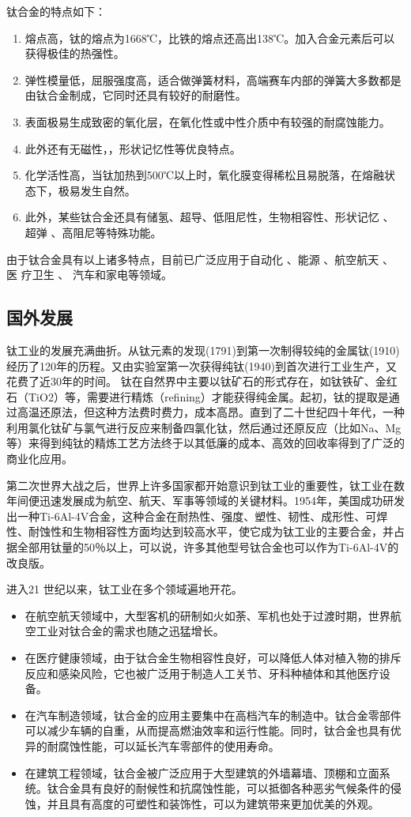 \documentclass[
class = book,
zihao = -4,
font = noto,
paper = a4paper,
openany
]{easybook}
\begin{document}
		钛合金的特点如下\cite{1997titanium}：
	\begin{enumerate}
		\item 熔点高，钛的熔点为1668℃，比铁的熔点还高出138℃。加入合金元素后可以获得极佳的热强性。
		\item 弹性模量低，屈服强度高，适合做弹簧材料，高端赛车内部的弹簧大多数都是由钛合金制成，它同时还具有较好的耐磨性。
		\item 表面极易生成致密的氧化层，在氧化性或中性介质中有较强的耐腐蚀能力。
		\item 此外还有无磁性，，形状记忆性等优良特点。
		\item 化学活性高，当钛加热到500℃以上时，氧化膜变得稀松且易脱落，在熔融状态下，极易发生自然。
		\item 此外，某些钛合金还具有储氢、超导、低阻尼性，生物相容性、形状记忆 、 超弹 、高阻尼等特殊功能。
	\end{enumerate}

	由于钛合金具有以上诸多特点，目前已广泛应用于自动化 、能源 、航空航天 、 医	疗卫生 、 汽车和家电等领域。
	\subsection{国外发展}
	钛工业的发展充满曲折。从钛元素的发现(1791)到第一次制得较纯的金属钛(1910)经历了120年的历程。又由实验室第一次获得纯钛(1940)到首次进行工业生产，又花费了近30年的时间。
	钛在自然界中主要以钛矿石的形式存在，如钛铁矿、金红石（TiO2）等，需要进行精炼（refining）才能获得纯金属。起初，钛的提取是通过高温还原法，但这种方法费时费力，成本高昂。直到了二十世纪四十年代，一种利用氯化钛矿与氯气进行反应来制备四氯化钛，然后通过还原反应（比如Na、Mg等）来得到纯钛的精炼工艺方法终于以其低廉的成本、高效的回收率得到了广泛的商业化应用。

	第二次世界大战之后，世界上许多国家都开始意识到钛工业的重要性，钛工业在数年间便迅速发展成为航空、航天、军事等领域的关键材料。1954年，美国成功研发出一种Ti-6Al-4V合金，这种合金在耐热性、强度、塑性、韧性、成形性、可焊性、耐蚀性和生物相容性方面均达到较高水平，使它成为钛工业的主要合金，并占据全部用钛量的50％以上，可以说，许多其他型号钛合金也可以作为Ti-6Al-4V的改良版。

	进入21 世纪以来，钛工业在多个领域遍地开花。
	\begin{itemize}
		\item 	在航空航天领域中，大型客机的研制如火如荼、军机也处于过渡时期，世界航空工业对钛合金的需求也随之迅猛增长。
		\item 在医疗健康领域，由于钛合金生物相容性良好，可以降低人体对植入物的排斥反应和感染风险，它也被广泛用于制造人工关节、牙科种植体和其他医疗设备。
		\item 在汽车制造领域，钛合金的应用主要集中在高档汽车的制造中。钛合金零部件可以减少车辆的自重，从而提高燃油效率和运行性能。同时，钛合金也具有优异的耐腐蚀性能，可以延长汽车零部件的使用寿命。
		\item 在建筑工程领域，钛合金被广泛应用于大型建筑的外墙幕墙、顶棚和立面系统。钛合金具有良好的耐候性和抗腐蚀性能，可以抵御各种恶劣气候条件的侵蚀，并且具有高度的可塑性和装饰性，可以为建筑带来更加优美的外观。

	\end{itemize}
\end{document}
